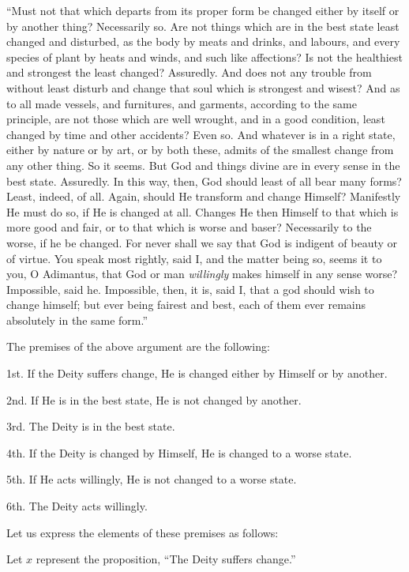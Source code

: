 \documentclass[oneside]{book}
\begin{document}
``Must not that which departs from its proper form be
changed either by itself or by another thing? Necessarily so.
Are not things which are in the best state least changed and disturbed,
as the body by meats and drinks, and labours, and every
species of plant by heats and winds, and such like affections? Is
not the healthiest and strongest the least changed? Assuredly.
And does not any trouble from without least disturb and change
that soul which is strongest and wisest? And as to all made
vessels, and furnitures, and garments, according to the same
principle, are not those which are well wrought, and in a good
condition, least changed by time and other accidents? Even so.
And whatever is in a right state, either by nature or by art, or
by both these, admits of the smallest change from any other
thing. So it seems. But God and things divine are in every
sense in the best state. Assuredly. In this way, then, God
should least of all bear many forms? Least, indeed, of all.
Again, should He transform and change Himself? Manifestly He
must do so, if He is changed at all. Changes He then Himself to
that which is more good and fair, or to that which is worse and
baser? Necessarily to the worse, if he be changed. For never
shall we say that God is indigent of beauty or of virtue. You
speak most rightly, said I, and the matter being so, seems it to
you, O Adimantus, that God or man \textit{willingly} makes himself in
any sense worse? Impossible, said he. Impossible, then, it is,
said I, that a god should wish to change himself; but ever being
fairest and best, each of them ever remains absolutely in the same
form.''

The premises of the above argument are the following:

1st. If the Deity suffers change, He is changed either by Himself
or by another.

2nd. If He is in the best state, He is not changed by another.

3rd. The Deity is in the best state.

4th. If the Deity is changed by Himself, He is changed to a
worse state.

5th. If He acts willingly, He is not changed to a worse state.

6th. The Deity acts willingly.

Let us express the elements of these premises as follows:

Let $x$ represent the proposition, ``The Deity suffers change.''

\end{document}
